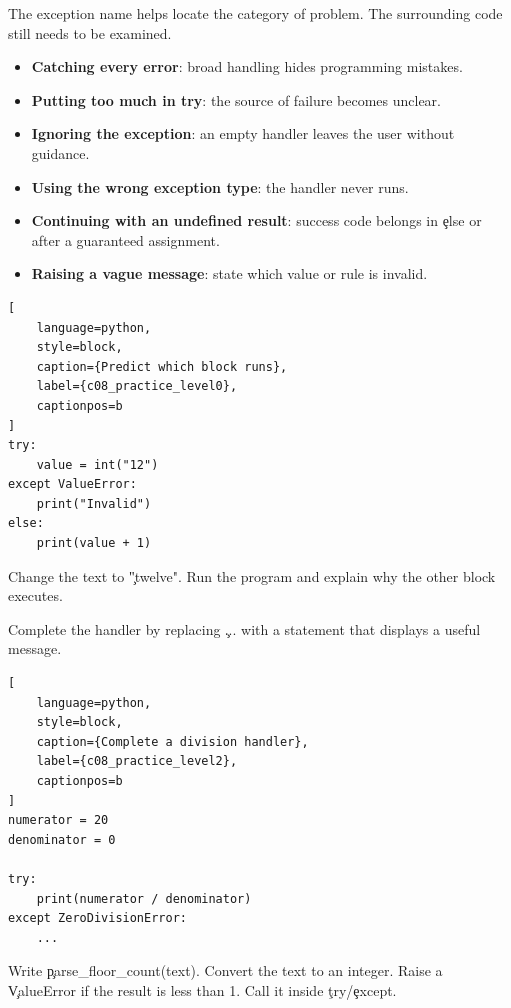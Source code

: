 The exception name helps locate the category of problem. The surrounding code
still needs to be examined.


\begin{itemize}
    \item \textbf{Catching every error}: broad handling hides programming mistakes.
    \item \textbf{Putting too much in try}: the source of failure becomes unclear.
    \item \textbf{Ignoring the exception}: an empty handler leaves the user without guidance.
    \item \textbf{Using the wrong exception type}: the handler never runs.
    \item \textbf{Continuing with an undefined result}: success code belongs in \c{else}
          or after a guaranteed assignment.
    \item \textbf{Raising a vague message}: state which value or rule is invalid.
\end{itemize}



\begin{lstlisting}[
    language=python,
    style=block,
    caption={Predict which block runs},
    label={c08_practice_level0},
    captionpos=b
]
try:
    value = int("12")
except ValueError:
    print("Invalid")
else:
    print(value + 1)
\end{lstlisting}


Change the text to \c{"twelve"}. Run the program and explain why the other
block executes.


Complete the handler by replacing \c{...} with a statement that displays a
useful message.

\begin{lstlisting}[
    language=python,
    style=block,
    caption={Complete a division handler},
    label={c08_practice_level2},
    captionpos=b
]
numerator = 20
denominator = 0

try:
    print(numerator / denominator)
except ZeroDivisionError:
    ...
\end{lstlisting}


Write \c{parse_floor_count(text)}. Convert the text to an integer. Raise a
\c{ValueError} if the result is less than 1. Call it inside \c{try}/\c{except}.

